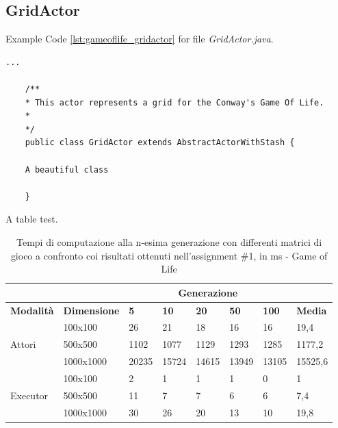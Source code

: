 \documentclass[12pt,a4paper,openright,oneside]{report}
\begin{document}
	\subsection{GridActor}
	Example Code \ref{lst:gameoflife_gridactor} for file \textit{GridActor.java}.\\
	\begin{lstlisting}[caption=Classe GridActor - Game of Life, label=lst:gameoflife_gridactor]
	...
	
	/**
	* This actor represents a grid for the Conway's Game Of Life.
	* 
	*/
	public class GridActor extends AbstractActorWithStash {
	
	A beautiful class
	
	}
	\end{lstlisting}
	
	A table test.
	
	\begin{table}[h]
		\centering
		\begin{tabular}{ll|lllll|l}
			\cline{3-7}
			&                    & \multicolumn{5}{c|}{\textbf{Generazione}} &                            \\ \hline
			\multicolumn{1}{|l|}{\textbf{Modalità}}       & \textbf{Dimensione} & \textbf{5} & \textbf{10} & \textbf{20} & \textbf{50} & \textbf{100}   & \multicolumn{1}{l|}{\textbf{Media}} \\ \hline
			
			\multicolumn{1}{|l|}{\multirow{3}{*}{Attori}} & 100x100            & 26    & 21    & 18    & 16    & 16    & \multicolumn{1}{l|}{19,4}      \\ \cline{2-2} \cline{8-8} 
			\multicolumn{1}{|l|}{}                        & 500x500            & 1102  & 1077  & 1129  & 1293  & 1285  & \multicolumn{1}{l|}{1177,2}      \\ \cline{2-2} \cline{8-8} 
			\multicolumn{1}{|l|}{}                        & 1000x1000          & 20235 & 15724 & 14615 & 13949 & 13105 & \multicolumn{1}{l|}{15525,6}      \\ \hline
			\multicolumn{1}{|l|}{\multirow{3}{*}{Executor}} & 100x100            & 2     & 1     & 1     & 1     & 0     & \multicolumn{1}{l|}{1}      \\ \cline{2-2} \cline{8-8} 
			\multicolumn{1}{|l|}{}                        & 500x500            & 11    & 7     & 7     & 6     & 6     & \multicolumn{1}{l|}{7,4}      \\ \cline{2-2} \cline{8-8} 
			\multicolumn{1}{|l|}{}                        & 1000x1000          & 30    & 26    & 20    & 13    & 10    & \multicolumn{1}{l|}{19,8}      \\ \hline
		\end{tabular}
		\caption{Tempi di computazione alla n-esima generazione con differenti
			matrici di gioco a confronto coi risultati ottenuti nell'assignment \#1, in ms - Game of Life}
		\label{table:gameoflife_tempi_celle}
	\end{table}
	
\end{document}
